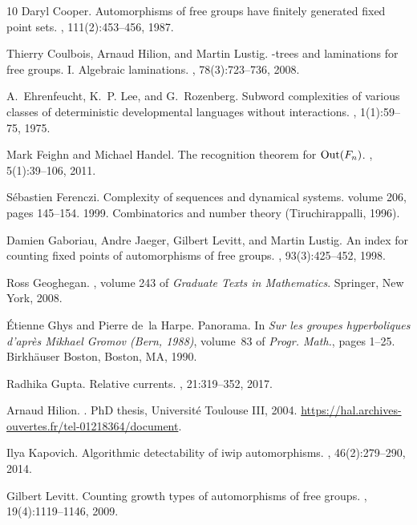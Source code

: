 \documentclass[11pt]{amsart}
\theoremstyle{remark}
\begin{document}
\begin{thebibliography}{10}
Daryl Cooper.
\newblock Automorphisms of free groups have finitely generated fixed point
  sets.
, 111(2):453--456, 1987.

Thierry Coulbois, Arnaud Hilion, and Martin Lustig.
-trees and laminations for free groups. {I}. {A}lgebraic
  laminations.
, 78(3):723--736, 2008.

A.~Ehrenfeucht, K.~P. Lee, and G.~Rozenberg.
\newblock Subword complexities of various classes of deterministic
  developmental languages without interactions.
, 1(1):59--75, 1975.

Mark Feighn and Michael Handel.
\newblock The recognition theorem for {${\rm Out}(F_n)$}.
, 5(1):39--106, 2011.

S\'{e}bastien Ferenczi.
\newblock Complexity of sequences and dynamical systems.
\newblock volume 206, pages 145--154. 1999.
\newblock Combinatorics and number theory (Tiruchirappalli, 1996).

Damien Gaboriau, Andre Jaeger, Gilbert Levitt, and Martin Lustig.
\newblock An index for counting fixed points of automorphisms of free groups.
, 93(3):425--452, 1998.

Ross Geoghegan.
, volume 243 of {\em
  Graduate Texts in Mathematics}.
\newblock Springer, New York, 2008.

\'{E}tienne Ghys and Pierre de~la Harpe.
\newblock Panorama.
\newblock In {\em Sur les groupes hyperboliques d'apr\`es {M}ikhael {G}romov
  ({B}ern, 1988)}, volume~83 of {\em Progr. Math.}, pages 1--25. Birkh\"{a}user
  Boston, Boston, MA, 1990.

Radhika Gupta.
\newblock Relative currents.
, 21:319--352, 2017.

Arnaud Hilion.
.
\newblock PhD thesis, Universit\'e Toulouse III, 2004.
\newblock \url{https://hal.archives-ouvertes.fr/tel-01218364/document}.

Ilya Kapovich.
\newblock Algorithmic detectability of iwip automorphisms.
, 46(2):279--290, 2014.

Gilbert Levitt.
\newblock Counting growth types of automorphisms of free groups.
, 19(4):1119--1146, 2009.


\end{thebibliography}
\end{document}

